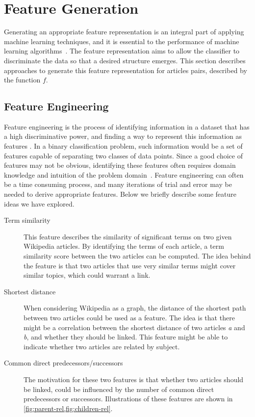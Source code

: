 \section{Feature Generation}\label{sec:feature_generation}
Generating an appropriate feature representation is an integral part of applying machine learning techniques, and it is essential to the performance of machine learning algorithms~\cite{ng-lecture}. The feature representation aims to allow the classifier to discriminate the data so that a desired structure emerges. This section describes approaches to generate this feature representation for articles pairs, described by the function $f$.

\subsection{Feature Engineering}
Feature engineering is the process of identifying information in a dataset that has a high discriminative power, and finding a way to represent this information as features . In a binary classification problem, such information would be a set of features capable of separating two classes of data points. Since a good choice of features may not be obvious, identifying these features often requires domain knowledge and intuition of the problem domain~\cite{ng-lecture,domingos2012few}. Feature engineering can often be a time consuming process, and many iterations of trial and error may be needed to derive appropriate features. Below we briefly describe some feature ideas we have explored.

\begin{description}
    \item[Term similarity] This feature describes the similarity of significant terms on two given Wikipedia articles. By identifying the terms of each article, a term similarity score between the two articles can be computed. The idea behind the feature is that two articles that use very similar terms might cover similar topics, which could warrant a link.
    \item[Shortest distance] When considering Wikipedia as a graph, the distance of the shortest path between two articles could be used as a feature. The idea is that there might be a correlation between the shortest distance of two articles \emph{a} and \emph{b}, and whether they should be linked.  This feature might be able to indicate whether two articles are related by subject.
    \item[Common direct predecessors/successors] The motivation for these two features is that whether two articles should be linked, could be influenced by the number of common direct predecessors or successors. Illustrations of these features are shown in \cref{fig:parent-rel,fig:children-rel}.
\end{description}

